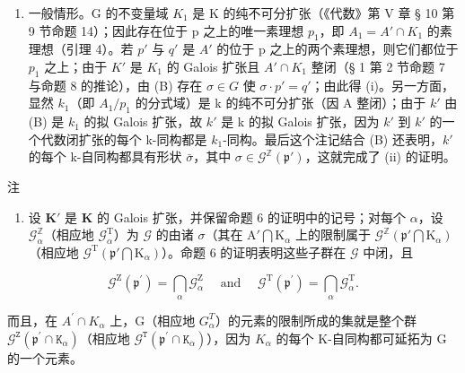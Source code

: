 \begin{enumerate}
\def\labelenumi{(\Alph{enumi})}
\setcounter{enumi}{2}
\tightlist
\item
  一般情形。G 的不变量域 \(K_{1}\) 是 K 的纯不可分扩张（《代数》第 V 章 § 10 第 9 节命题 14）；因此存在位于 p 之上的唯一素理想 \(p_{1}\)，即 \(A_{1} = A' \cap K_{1}\) 的素理想（引理 4）。若 \(p'\) 与 \(q'\) 是 \(A'\) 的位于 p 之上的两个素理想，则它们都位于 \(p_{1}\) 之上；由于 \(K'\) 是 \(K_{1}\) 的 Galois 扩张且 \(A' \cap K_{1}\) 整闭（§ 1 第 2 节命题 7 与命题 8 的推论），由 (B) 存在 \(\sigma \in G\) 使 \(\sigma \cdot p' = q'\)；由此得 (i)。另一方面，显然 \(k_{1}\)（即 \(A_{1}/p_{1}\) 的分式域）是 k 的纯不可分扩张（因 A 整闭）；由于 \(k'\) 由 (B) 是 \(k_{1}\) 的拟 Galois 扩张，故 \(k'\) 是 k 的拟 Galois 扩张，因为 \(k'\) 到 \(k'\) 的一个代数闭扩张的每个 k-同构都是 \(k_{1}\)-同构。最后这个注记结合 (B) 还表明，\(k'\) 的每个 k-自同构都具有形状 \(\bar{\sigma}\)，其中 \(\sigma \in \mathcal{G}^{\mathbb{Z}}(\mathfrak{p}')\)，这就完成了 (ii) 的证明。
\end{enumerate}

注

\begin{enumerate}
\def\labelenumi{(\arabic{enumi})}
\setcounter{enumi}{1}
\tightlist
\item
  设 \(\mathbf{K}'\) 是 \(\mathbf{K}\) 的 Galois 扩张，并保留命题 6 的证明中的记号；对每个 \(\alpha\)，设 \(\mathcal{G}_{\alpha}^{\mathbb{Z}}\)（相应地 \(\mathcal{G}_{\alpha}^{\mathrm{T}}\)）为 \(\mathcal{G}\) 的由诸 \(\sigma\)（其在 \(\mathrm{A}' \bigcap \mathrm{K}_{\alpha}\) 上的限制属于 \(\mathcal{G}^{\mathbb{Z}}(\mathfrak{p}' \bigcap \mathrm{K}_{\alpha})\)（相应地 \(\mathcal{G}^{\mathrm{T}}(\mathfrak{p}' \bigcap \mathrm{K}_{\alpha})\)）。命题 6 的证明表明这些子群在 \(\mathcal{G}\) 中闭，且
\end{enumerate}

\[
\mathcal {G} ^ {\mathrm{Z}} \left(\mathfrak {p} ^ {\prime}\right) = \bigcap_ {\alpha} \mathcal {G} _ {\alpha} ^ {\mathrm{Z}} \quad \text { and } \quad \mathcal {G} ^ {\mathrm{T}} \left(\mathfrak {p} ^ {\prime}\right) = \bigcap_ {\alpha} \mathcal {G} _ {\alpha} ^ {\mathrm{T}}.
\]

而且，在 \(A^{\prime} \cap K_{\alpha}\) 上，G（相应地 \(G_{\alpha}^{T}\)）的元素的限制所成的集就是整个群 \(\mathcal{G}^{\mathtt{Z}}(\mathfrak{p}^{\prime} \cap \mathtt{K}_{\alpha})\)（相应地 \(\mathcal{G}^{\mathtt{T}}(\mathfrak{p}^{\prime} \cap \mathtt{K}_{\alpha})\)），因为 \(K_{\alpha}\) 的每个 K-自同构都可延拓为 G 的一个元素。

